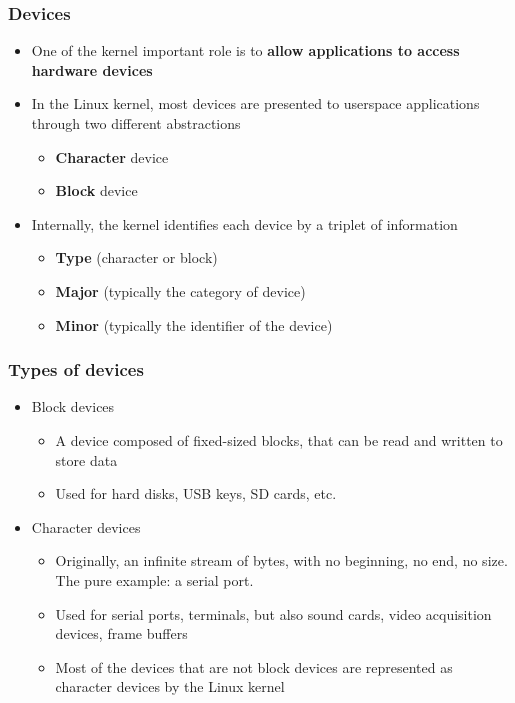 \begin{frame}
  \frametitle{Devices}
  \begin{itemize}
  \item One of the kernel important role is to {\bf allow applications
      to access hardware devices}
  \item In the Linux kernel, most devices are presented to userspace
    applications through two different abstractions
    \begin{itemize}
    \item {\bf Character} device
    \item {\bf Block} device
    \end{itemize}
  \item Internally, the kernel identifies each device by a triplet of
    information
    \begin{itemize}
    \item {\bf Type} (character or block)
    \item {\bf Major} (typically the category of device)
    \item {\bf Minor} (typically the identifier of the device)
    \end{itemize}
  \end{itemize}
\end{frame}

\begin{frame}
  \frametitle{Types of devices}
  \begin{itemize}
  \item Block devices
    \begin{itemize}
    \item A device composed of fixed-sized blocks, that can be read
      and written to store data
    \item Used for hard disks, USB keys, SD cards, etc.
    \end{itemize}
  \item Character devices
    \begin{itemize}
    \item Originally, an infinite stream of bytes, with no beginning,
      no end, no size. The pure example: a serial port.
    \item Used for serial ports, terminals, but also sound cards,
      video acquisition devices, frame buffers
    \item Most of the devices that are not block devices are
      represented as character devices by the Linux kernel
    \end{itemize}
  \end{itemize}
\end{frame}

